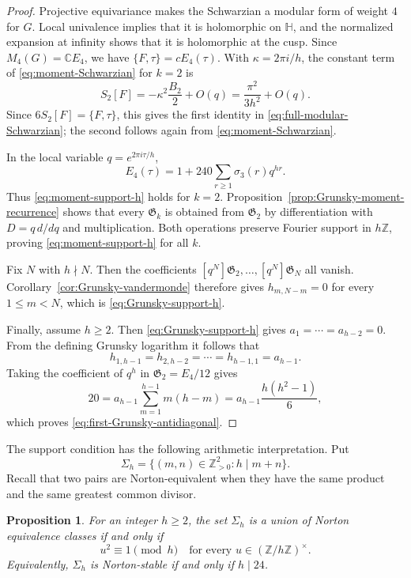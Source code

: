 \documentclass[11pt]{amsart}
\newtheorem{prop}[thm]{Proposition}
\theoremstyle{definition}
\theoremstyle{remark}
\numberwithin{equation}{section}
\begin{document}
\begin{proof}
Projective equivariance makes the Schwarzian a modular form of weight $4$ for $G$.  Local univalence implies that it is holomorphic on $\mathbb H$, and the normalized expansion at infinity shows that it is holomorphic at the cusp.  Since $M_4(G)=\mathbb C E_4$, we have $\{F,\tau\}=cE_4(\tau)$.  With $\kappa=2\pi i/h$, the constant term of \eqref{eq:moment-Schwarzian} for $k=2$ is
\[
S_2[F]
=-\kappa^2\frac{B_2}{2}+O(q)
=
\frac{\pi^2}{3h^2}+O(q).
\]
Since $6S_2[F]=\{F,\tau\}$, this gives the first identity in \eqref{eq:full-modular-Schwarzian}; the second follows again from \eqref{eq:moment-Schwarzian}.

In the local variable $q=e^{2\pi i\tau/h}$,
\[
E_4(\tau)
=
1+240\sum_{r\geq1}\sigma_3(r)q^{hr}.
\]
Thus \eqref{eq:moment-support-h} holds for $k=2$.  Proposition~\ref{prop:Grunsky-moment-recurrence} shows that every $\mathfrak G_k$ is obtained from $\mathfrak G_2$ by differentiation with $D=q\,d/dq$ and multiplication.  Both operations preserve Fourier support in $h\mathbb Z$, proving \eqref{eq:moment-support-h} for all $k$.

Fix $N$ with $h\nmid N$.  Then the coefficients $[q^N]\mathfrak G_2,\ldots,[q^N]\mathfrak G_N$ all vanish.  Corollary~\ref{cor:Grunsky-vandermonde} therefore gives $h_{m,N-m}=0$ for every $1\leq m<N$, which is \eqref{eq:Grunsky-support-h}.

Finally, assume $h\geq2$.  Then \eqref{eq:Grunsky-support-h} gives $a_1=\cdots=a_{h-2}=0$.  From the defining Grunsky logarithm it follows that
\[
h_{1,h-1}=h_{2,h-2}=\cdots=h_{h-1,1}=a_{h-1}.
\]
Taking the coefficient of $q^h$ in $\mathfrak G_2=E_4/12$ gives
\[
20
=
a_{h-1}\sum_{m=1}^{h-1}m(h-m)
=
a_{h-1}\frac{h(h^2-1)}6,
\]
which proves \eqref{eq:first-Grunsky-antidiagonal}.
\end{proof}

The support condition has the following arithmetic interpretation. Put
\[
\Sigma_h=\{(m,n)\in\mathbb Z_{>0}^2:h\mid m+n\}.
\]
Recall that two pairs are Norton-equivalent when they have the same product and the same greatest common divisor.

\begin{prop}\label{prop:Norton-support-24}
For an integer $h\geq2$, the set $\Sigma_h$ is a union of Norton equivalence classes if and only if
\[
u^2\equiv1\pmod h
\quad\text{for every }u\in(\mathbb Z/h\mathbb Z)^\times.
\]
Equivalently, $\Sigma_h$ is Norton-stable if and only if $h\mid24$.
\end{prop}
\end{document}
